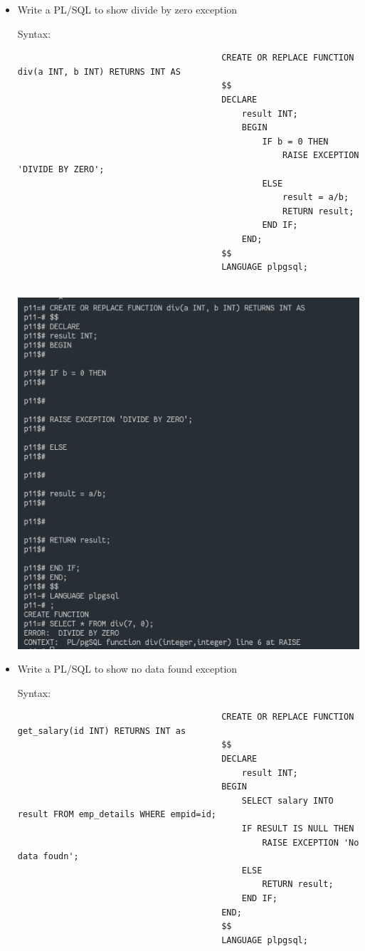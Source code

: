 \documentclass[13pt,oneside]{book}
\begin{document}
\begin{itemize}
									
									\item
									Write a PL/SQL to show divide by zero exception
								
									Syntax:
									\begin{verbatim}
										CREATE OR REPLACE FUNCTION div(a INT, b INT) RETURNS INT AS 
										$$
										DECLARE
											result INT;
											BEGIN
												IF b = 0 THEN
													RAISE EXCEPTION 'DIVIDE BY ZERO';
												ELSE
													result = a/b;
													RETURN result;
												END IF;
											END;
										$$
										LANGUAGE plpgsql;
									
									\end{verbatim}
									\includegraphics[]{img/p10/ss5.png}
									
									
									\item
									Write a PL/SQL to show no data found exception
									 
									Syntax:
									\begin{verbatim}
										CREATE OR REPLACE FUNCTION get_salary(id INT) RETURNS INT as
										$$
										DECLARE
											result INT;
										BEGIN
											SELECT salary INTO result FROM emp_details WHERE empid=id;
											IF RESULT IS NULL THEN
												RAISE EXCEPTION 'No data foudn';
											ELSE
												RETURN result;
											END IF;
										END;
										$$
										LANGUAGE plpgsql;
									

\end{verbatim}
\end{itemize}
\end{document}
